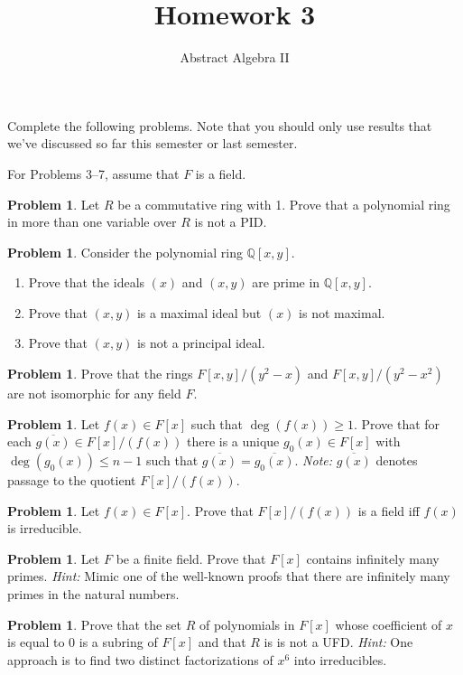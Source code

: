 \documentclass[11pt]{scrartcl}
\theoremstyle{definition}
\newtheorem{problem}[theorem]{Problem}
\newcommand{\blankline}{\pagebreak[2]\vspace{.5\baselineskip}}
\begin{document}
\title{Homework 3}
\subtitle{Abstract Algebra II}
\date{}

\maketitle
\thispagestyle{fancy}

Complete the following problems. Note that you should only use results that we've discussed so far this semester or last semester.

\blankline

For Problems 3--7, assume that $F$ is a field.

\begin{problem}
Let $R$ be a commutative ring with 1.  Prove that a polynomial ring in more than one variable over $R$ is not a PID.
\end{problem}

\begin{problem}
Consider the polynomial ring $\mathbb{Q}[x,y]$.
\begin{enumerate}[label=\rm{(\alph*)}]
\item Prove that the ideals $(x)$ and $(x,y)$ are prime in $\mathbb{Q}[x,y]$.
\item Prove that $(x,y)$ is a maximal ideal but $(x)$ is not maximal.
\item Prove that $(x,y)$ is not a principal ideal.
\end{enumerate}
\end{problem}

\begin{problem}
Prove that the rings $F[x,y]/(y^2-x)$ and $F[x,y]/(y^2-x^2)$ are not isomorphic for any field $F$.
\end{problem}

\begin{problem}
Let $f(x)\in F[x]$ such that $\deg(f(x))\geq 1$.  Prove that for each $\overline{g(x)}\in F[x]/(f(x))$ there is a unique $g_0(x)\in F[x]$ with $\deg(g_0(x))\leq n-1$ such that $\overline{g(x)}=\overline{g_0(x)}$. \emph{Note:} $\overline{g(x)}$ denotes passage to the quotient $F[x]/(f(x))$.
\end{problem}

\begin{problem}
Let $f(x)\in F[x]$.  Prove that $F[x]/(f(x))$ is a field iff $f(x)$ is irreducible.
\end{problem}

\begin{problem}
Let $F$ be a finite field.  Prove that $F[x]$ contains infinitely many primes. \emph{Hint:} Mimic one of the well-known proofs that there are infinitely many primes in the natural numbers.  
\end{problem}

\begin{problem}
Prove that the set $R$ of polynomials in $F[x]$ whose coefficient of $x$ is equal to 0 is a subring of $F[x]$ and that $R$ is is not a UFD.  \emph{Hint:} One approach is to find two distinct factorizations of $x^6$ into irreducibles.
\end{problem}
\end{document}
